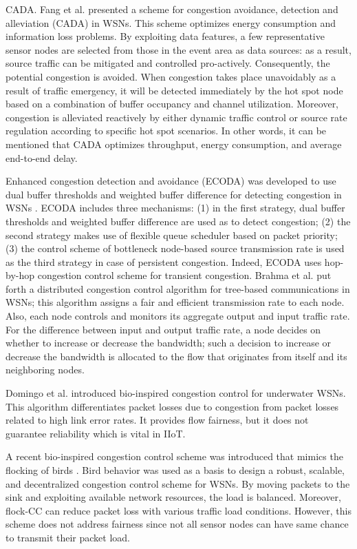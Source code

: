 CADA. Fang et al. \cite{Fang2009} presented a scheme for congestion avoidance, detection and alleviation (CADA) in WSNs. This scheme optimizes energy consumption and information loss problems. By exploiting data features, a few representative sensor nodes are selected from those in the event area as data sources: as a result, source traffic can be mitigated and controlled pro-actively. Consequently, the potential congestion is avoided. When congestion takes place unavoidably as a result of traffic emergency, it will be detected immediately by the hot spot node based on a combination of buffer occupancy and channel utilization. Moreover, congestion is alleviated reactively by either dynamic traffic control or source rate regulation according to specific hot spot scenarios. In other words, it can be mentioned that CADA optimizes throughput, energy consumption, and average end-to-end delay.

Enhanced congestion detection and avoidance (ECODA) was developed to use dual buffer thresholds and weighted buffer difference for detecting congestion in WSNs \cite{5606274}. ECODA includes three mechanisms: (1) in the first strategy, dual buffer thresholds and weighted buffer difference are used as to detect congestion; (2) the second strategy makes use of flexible queue scheduler based on packet priority; (3) the control scheme of bottleneck node-based source transmission rate is used as the third strategy in case of persistent congestion. Indeed, ECODA uses hop-by-hop congestion control
scheme for transient congestion. Brahma et al. \cite{BRAHMA2012670} put forth a distributed congestion control algorithm for tree-based communications in WSNs; this algorithm assigns a fair and efficient transmission rate to each node. Also, each node controls and monitors its aggregate output and input
traffic rate. For the difference between input and output traffic rate, a node decides on whether to increase or decrease the bandwidth; such a decision to increase or decrease
the bandwidth is allocated to the flow that originates from itself and its neighboring nodes.

Domingo et al. \cite{DOMINGO2013203} introduced bio-inspired congestion control for underwater WSNs. This algorithm differentiates packet losses due to congestion from packet losses related to high link error rates. It provides flow fairness, but it does not guarantee reliability which is vital in IIoT.

A recent bio-inspired congestion control scheme was introduced that mimics the flocking of birds \cite{ANTONIOU20131167}. Bird behavior was used as a basis to design a robust, scalable, and decentralized congestion control scheme for WSNs. By moving packets to the sink and exploiting available network resources, the load is balanced. Moreover, flock-CC can reduce packet loss with various traffic load conditions. However, this scheme does not address fairness since not all sensor nodes can have same chance to transmit their packet load.

